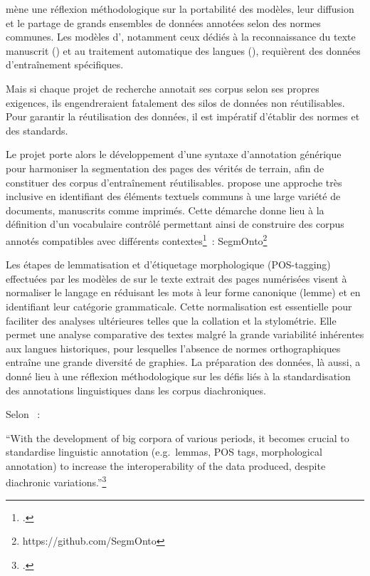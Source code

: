 \gaga mène une réflexion
méthodologique sur la portabilité des modèles, leur diffusion et le
partage de grands ensembles de données annotées selon des normes
communes. Les modèles d'\ia, notamment ceux dédiés à la
reconnaissance du texte manuscrit (\htr) et au traitement automatique des
langues (\tal), requièrent des données d'entraînement spécifiques. 

Mais si chaque projet de recherche annotait ses corpus selon ses propres
exigences, ils engendreraient fatalement des silos de données non
réutilisables. Pour garantir la réutilisation des données, il est
impératif d'établir des normes et des standards.

Le projet porte alors le développement d'une syntaxe
d'annotation générique pour harmoniser la segmentation des pages des
vérités de terrain, afin de constituer des corpus d'entraînement réutilisables. \gaga propose une
approche très inclusive en identifiant des éléments textuels communs à
une large variété de documents, manuscrits comme imprimés. Cette
démarche donne lieu à la définition d'un vocabulaire contrôlé permettant
ainsi de construire des corpus annotés compatibles avec différents contextes\footcite[``Using a common vocabulary to annotate zones called SegmOnto (that is still evolving), we have developed a generic workflow to analyse the layout, OCRise the text, and convert the ALTO output into minimally encoded TEI files (\dots).''][p.2]{janes_towards_2021}~:
SegmOnto\footnote{https://github.com/SegmOnto}

Les étapes de lemmatisation et d'étiquetage morphologique (POS-tagging) effectuées par les modèles de \tal sur le texte extrait des pages numérisées visent à normaliser le
langage en réduisant les mots à leur forme canonique (lemme) et en
identifiant leur catégorie grammaticale. Cette normalisation est
essentielle pour faciliter des analyses ultérieures telles que la
collation et la stylométrie. Elle permet une analyse comparative des textes
malgré la grande variabilité inhérentes aux
langues historiques, pour lesquelles l'absence de normes orthographiques entraîne une
grande diversité de graphies. La préparation des données, là aussi, a donné lieu à une
réflexion méthodologique sur les défis liés à la standardisation des
annotations linguistiques dans les corpus diachroniques.

Selon \citeauthor{gabay_standardizing_2020}~:
\begin{kwote}                     
	``With the development of big corpora of various periods, it becomes
	crucial to standardise linguistic annotation (e.g.~lemmas, POS tags,
	morphological annotation) to increase the interoperability of the data
	produced, despite diachronic variations.''\footcite[p.2]{gabay_standardizing_2020}
\end{kwote}  

